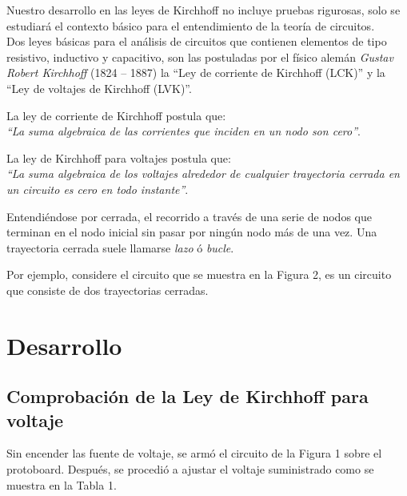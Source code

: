 \documentclass[a4paper,12pt]{article}
\begin{document}
Nuestro desarrollo en las leyes de Kirchhoff no incluye pruebas rigurosas, solo se estudiará el contexto básico para el entendimiento de la teoría de circuitos.\\
Dos leyes básicas para el análisis de circuitos que contienen elementos de tipo resistivo, inductivo y capacitivo, son las postuladas por el físico alemán \emph{Gustav Robert Kirchhoff} (1824 – 1887) la “Ley de corriente de Kirchhoff (LCK)” y la “Ley de voltajes de Kirchhoff (LVK)”.

\vspace{.5cm}

La ley de corriente de Kirchhoff postula que:\\
\textit{	“La suma algebraica de las corrientes que inciden en un nodo son cero”}.\\

\vspace{.5cm}

La ley de Kirchhoff para voltajes postula que:\\
\textit{ “La suma algebraica de los voltajes alrededor de cualquier trayectoria cerrada en un circuito es cero en todo instante”}.\\

\vspace{.5cm}

Entendiéndose por cerrada, el recorrido a través de una serie de nodos que terminan en el nodo inicial sin pasar por ningún nodo más de una vez. Una trayectoria cerrada suele llamarse \emph{lazo} ó \emph{bucle}.

Por ejemplo, considere el circuito que se muestra en la Figura 2, es un circuito que consiste de dos trayectorias cerradas.\\

\newpage

\section{Desarrollo}

\subsection{Comprobación de la Ley de Kirchhoff para voltaje}

Sin encender las fuente de voltaje, se armó el circuito de la Figura 1 sobre el protoboard. Después, se procedió a ajustar el voltaje suministrado como se muestra en la Tabla 1. 

\vspace{0.5cm}
\end{document}
